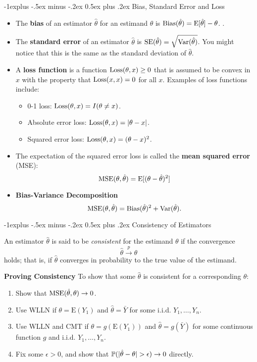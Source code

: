 \documentclass[10pt,landscape]{article}
\makeatletter
\renewcommand{\subsection}{\@startsection{subsection}{2}{0mm}%
                                {-1explus -.5ex minus -.2ex}%
                                {0.5ex plus .2ex}%
                                {\normalfont\normalsize\bfseries}}
\newcommand{\E}{\text{E}}
\makeatother
\begin{document}
\begin{multicols*}{3}
\subsection{Bias, Standard Error and Loss}
\begin{itemize}
    \item The \textbf{bias} of an estimator $\hat{\theta}$ for an estimand $\theta$ is $\Bias(\hat{\theta})=\E [\hat{\theta}]-\theta$. .
    \item The \textbf{standard error} of an estimator $\hat{\theta}$ is $\operatorname{SE}(\hat{\theta})=\sqrt{\operatorname{Var} (\hat{\theta})}$. You might notice that this is the same as the standard deviation of $\hat{\theta}$.
    \item A \textbf{loss function} is a function $\operatorname{Loss}(\theta,x)\geq 0$ that is assumed to be convex in $x$ with the property that $\operatorname{Loss}(x,x)=0$ for all $x$. Examples of loss functions include:
    \begin{itemize}
        \item 0-1 loss: $\operatorname{Loss}(\theta,x)=I (\theta\neq x)$.
        \item Absolute error loss: $\operatorname{Loss}(\theta,x)=|\theta-x|$.
        \item Squared error loss: $\operatorname{Loss}(\theta,x)=(\theta-x)^2$.
    \end{itemize}
    \item The expectation of the squared error loss is called the \textbf{mean squared error} (MSE): $$\MSE(\theta,\hat{\theta})=\E[ (\theta-\hat{\theta})^2]$$
    \item \textbf{Bias-Variance Decomposition}$$\operatorname{MSE}(\theta,\hat{\theta})=\operatorname{Bias}(\hat{\theta})^2+\operatorname{Var}( \hat{\theta}).$$
\end{itemize}

\subsection{Consistency of Estimators}

An estimator $\hat{\theta}$ is said to be \emph{consistent} for the estimand $\theta$ if the convergence $$\hat{\theta}\xrightarrow{p}\theta$$ holds; that is, if $\hat{\theta}$ converges in probability to the true value of the estimand.

\textbf{Proving Consistency}
 To show that some $\hat{\theta}$ is consistent for a corresponding $\theta$: 
\begin{enumerate}
    \item Show that $\operatorname{MSE}(\hat{\theta},\theta)\to 0$.
    \item Use WLLN if $\theta=\E (Y_1)$ and $\hat{\theta}=\bar{Y}$ for some i.i.d. $Y_1,\dots,Y_n$.
    \item Use WLLN and CMT if $\theta=g(\E (Y_1))$ and $\hat{\theta}=g(\bar{Y})$ for some continuous function $g$ and i.i.d. $Y_1,\dots,Y_n$.
    \item Fix some $\epsilon>0$, and show that $\PP(|\hat{\theta}-\theta|>\epsilon)\to 0$ directly.
\end{enumerate}


\end{multicols*}
\end{document}
